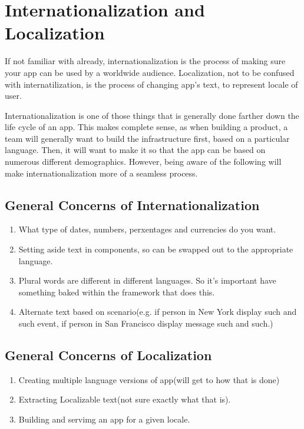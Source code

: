 \chapter{ Internationalization and Localization}

If not familiar with already, internationalization is the process of making sure
your app can be used by a worldwide audience. Localization, not to be confused 
with internatilization, is the process of changing app's text, to represent 
locale of user.

Internationalization is one of those things that is generally done farther down
the life cycle of an app. This makes complete sense, as when building a product, 
a team will generally want to build the infrastructure first, based on a 
particular language. Then, it will want to make it so that the app can be based 
on numerous different demographics. However, being aware of the following will 
make internationalization more of a seamless process. 

\section{General Concerns of Internationalization }

\begin{enumerate}
  \item What type of dates, numbers, perxentages and currencies do you want. 
  \item Setting aside text in components, so can be swapped out to the 
  appropriate language. 
  \item Plural words are different in different languages. So it's important 
  have something baked within the framework that does this. 
  \item Alternate text based on scenario(e.g. if person in New York display 
  such and such event, if person in San Francisco display message such and 
  such.)
\end{enumerate}

\section{General Concerns of Localization }
\begin{enumerate}
  \item Creating multiple language versions of app(will get to how that is done)
  \item Extracting Localizable text(not sure exactly what that is).
  \item Building and servimg an app for a given locale. 
\end{enumerate}

